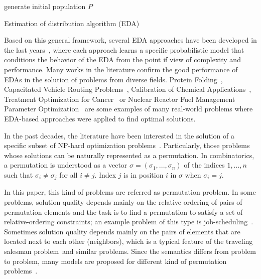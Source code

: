 \begin{algorithm}[t]
    generate initial population $P$\;
    \caption{Estimation of distribution algorithm (EDA)}
    \label{alg:eda}
\end{algorithm}

Based on this general framework, several EDA approaches have been developed in the last years~\citep{Harik1999, pelikan2005hierarchical, Yu2009}, where each approach learns a specific probabilistic model that conditions the behavior of the EDA from the point if view of complexity and performance. Many works in the literature confirm the good performance of EDAs in the solution of problems from diverse fields. Protein Folding~\citep{santana2008protein}, Capacitated Vehicle Routing Problems~\citep{tsutsui2004solving}, Calibration of Chemical Applications~\citep{mendiburu2006parallel}, Treatment Optimization for Cancer~\citep{brownlee2008application} or Nuclear Reactor Fuel Management Parameter Optimization~\citep{jiang2006estimation} are some examples of many real-world problems where EDA-based approaches were applied to find optimal solutions.

In the past decades, the literature have been interested in the solution of a specific subset of NP-hard optimization problems~\citep{ceberio2012review, bosman2001crossing, tsutsui2002probabilistic, tsutsui2006node, ceberio2011introducing, ceberio2013plackett, pelikan2007dependency}. Particularly, those problems whose solutions can be naturally represented as a permutation. In combinatorics, a permutation is understood as a vector $\sigma = (\sigma_1,..., \sigma_n)$ of the indices ${1,...,n}$ such that $\sigma_i \neq \sigma_j$ for all $i \neq j$. Index $j$ is in position $i$ in $\sigma$ when $\sigma_i = j$.

In this paper, this kind of problems are referred as permutation problem. In some problems, solution quality depends mainly on the relative ordering of pairs of permutation elements and the task is to find a permutation to satisfy a set of relative-ordering constraints; an example problem of this type is job-scheduling~\citep{taillard1993benchmarks, johnson1954optimal}. Sometimes solution quality depends mainly on the pairs of elements that are located next to each other (neighbors), which is a typical feature of the traveling salesman problem~\citep{goldberg1985alleles}and similar problems. Since the semantics differs from problem to problem, many models are proposed for different kind of permutation problems~\citep{tsutsui2002probabilistic, tsutsui2006node, ceberio2011introducing, ceberio2013plackett, tsutsui2006edge, tsutsui2006comparative}. 

